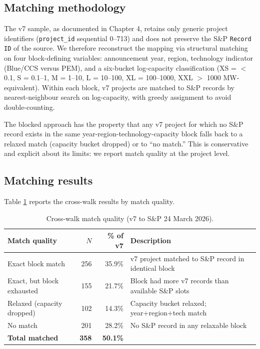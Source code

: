 \documentclass[11pt,a4paper]{article}
\begin{document}
\subsection{Matching methodology}
\label{app:matching-method}

The v7 sample, as documented in Chapter 4, retains only generic project identifiers (\texttt{project\_id} sequential 0--713) and does not preserve the S\&P \texttt{Record ID} of the source. We therefore reconstruct the mapping via structural matching on four block-defining variables: announcement year, region, technology indicator (Blue/CCS versus PEM), and a six-bucket log-capacity classification (XS = $<$0.1, S = 0.1--1, M = 1--10, L = 10--100, XL = 100--1000, XXL $>$ 1000 MW-equivalent). Within each block, v7 projects are matched to S\&P records by nearest-neighbour search on log-capacity, with greedy assignment to avoid double-counting.

The blocked approach has the property that any v7 project for which no S\&P record exists in the same year-region-technology-capacity block falls back to a relaxed match (capacity bucket dropped) or to ``no match.'' This is conservative and explicit about its limits: we report match quality at the project level.

\subsection{Matching results}

Table \ref{tab:app-matching-quality} reports the cross-walk results by match quality.

\begin{table}[ht]
\centering
\caption{Cross-walk match quality (v7 to S\&P 24 March 2026).}
\label{tab:app-matching-quality}
\begin{tabular}{lrrl}
\toprule
Match quality & $N$ & \% of v7 & Description \\
\midrule
Exact block match           & 256 & 35.9\% & v7 project matched to S\&P record in identical block \\
Exact, but block exhausted  & 155 & 21.7\% & Block had more v7 records than available S\&P slots \\
Relaxed (capacity dropped)  & 102 & 14.3\% & Capacity bucket relaxed; year+region+tech match \\
No match                    & 201 & 28.2\% & No S\&P record in any relaxable block \\
\midrule
\textbf{Total matched}      & \textbf{358} & \textbf{50.1\%} & \\
\bottomrule
\end{tabular}
\end{table}
\end{document}
